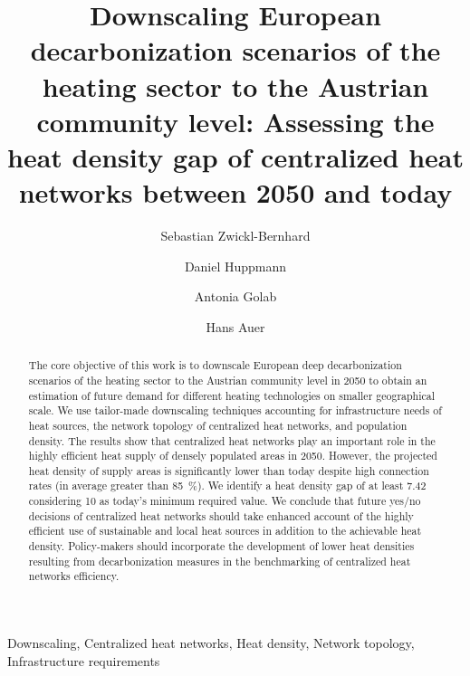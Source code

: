 \documentclass[review]{elsarticle}
\begin{document}
\begin{frontmatter}

\title{Downscaling European decarbonization scenarios of the heating sector to the Austrian community level: Assessing the heat density gap of centralized heat networks between 2050 and today}
\author[1,2]{Sebastian Zwickl-Bernhard}
\author[2]{Daniel Huppmann}
\author[1]{Antonia Golab}
\author[1]{Hans Auer}
\address[1]{Energy Economics Group (EEG), Technische Universität Wien, Gusshausstrasse 25-29/E370-3, 1040 Wien, Austria}
\address[2]{Energy, Climate and Environment (ECE) Program,  International Institute for Applied Systems Analysis (IIASA), Laxenburg, Austria}

\begin{abstract}
	The core objective of this work is to downscale European deep decarbonization scenarios of the heating sector to the Austrian community level in 2050 to obtain an estimation of future demand for different heating technologies on smaller geographical scale. We use tailor-made downscaling techniques accounting for infrastructure needs of heat sources, the network topology of centralized heat networks, and population density. The results show that centralized heat networks play an important role in the highly efficient heat supply of densely populated areas in 2050. However, the projected heat density of supply areas is significantly lower than today despite high connection rates (in average greater than \SI{85}{\%}). We identify a heat density gap of at least \SI{7.42}{} considering \SI{10}{} as today's minimum required value. We conclude that future yes/no decisions of centralized heat networks should take enhanced account of the highly efficient use of sustainable and local heat sources in addition to the achievable heat density. Policy-makers should incorporate the development of lower heat densities resulting from decarbonization measures in the benchmarking of centralized heat networks efficiency.  
\end{abstract}

\begin{keyword}
	Downscaling, Centralized heat networks, Heat density, Network topology, Infrastructure requirements
\end{keyword}
\end{frontmatter}

\linenumbers

\newpage

\newpage

\newpage

\end{document}
